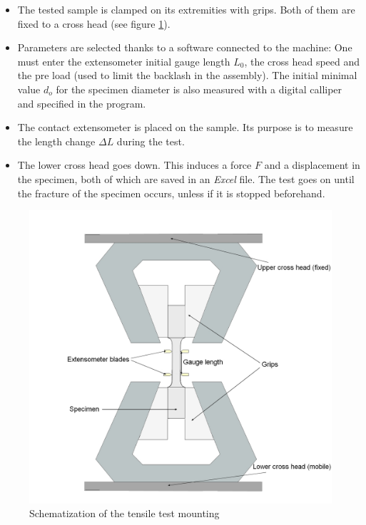 \begin{itemize}
\item The tested sample is clamped on its extremities with grips. Both of them are fixed to a cross head (see figure \ref{fig:Trac}).

\item Parameters are selected thanks to a software connected to the machine: 
One must enter the extensometer initial gauge length $L_0$, the cross head speed and the pre load (used to limit the backlash in the assembly). The initial minimal value $d_o$ for the specimen diameter is also measured with a digital calliper and specified in the program.

\item The contact extensometer is placed on the sample. Its purpose is to measure the length change $\Delta L$ during the test. 

\item The lower cross head goes down. This induces a force $F$ and a displacement in the specimen, both of which are saved in an \textit{Excel} file. The test goes on until the fracture of the specimen occurs, unless if it is stopped beforehand.
\end{itemize}

\begin{figure}[ht]
\centering
\centerline{\includegraphics[scale=0.3]{Images/Trac}}
\decoRule
\caption[Schematization of the tensile test mounting]{Schematization of the tensile test mounting}
\label{fig:Trac}
\end{figure}

